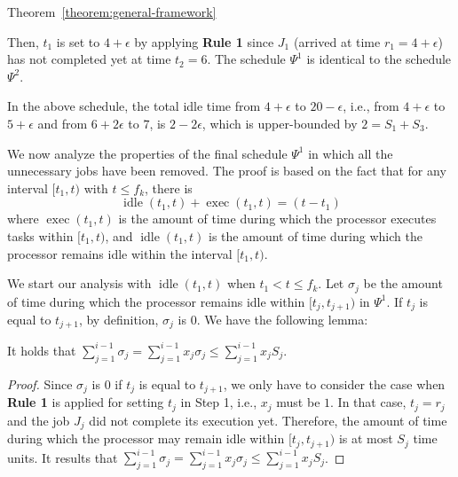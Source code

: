 \begin{appProof}{Theorem~\ref{theorem:general-framework}}
\begin{example}
Then, $t_1$ is set to $4+\epsilon$ by applying {\bf Rule 1} since
$J_1$ (arrived at time $r_1=4+\epsilon$) has not completed yet at time
$t_2=6$.  The schedule $\Psi^1$ is identical to the schedule
$\Psi^2$.


In the above schedule, the total idle time from $4+\epsilon$ to
$20-\epsilon$, i.e., from $4+\epsilon$ to $5+\epsilon$ and from
$6+2\epsilon$ to $7$, is $2-2\epsilon$, which is upper-bounded by $2 =
S_1+S_3$. 
\myendproof
\end{example}


We now analyze the properties of the final schedule $\Psi^1$ in which all the unnecessary jobs have been removed. 
The proof is based on the fact that for any interval $[t_1, t)$ with $t \leq f_k$, there is 
\begin{equation}
\label{eq:exec_plus_idle}
\operatorname{idle}(t_1, t) + \operatorname{exec}(t_1, t)  = (t - t_1)
\end{equation}
where $\operatorname{exec}(t_1, t)$ is the amount of time during which the processor executes tasks within $[t_1, t)$, and $\operatorname{idle}(t_1, t)$ is the amount of time during which the processor remains idle within the interval $[t_1, t)$.


We start our analysis with $\operatorname{idle}(t_1, t)$ when $t_1 < t \leq f_k$.
Let $\sigma_j$ be the amount of time during which the processor remains idle within $[t_j, t_{j+1})$ in $\Psi^1$. If $t_j$ is equal to $t_{j+1}$, by definition, $\sigma_j$ is $0$.
We have the following lemma:
\begin{Lemma}
\label{lem:max_idle}
It holds that $\sum_{j=1}^{i-1} \sigma_j  = \sum_{j=1}^{i-1} x_j \sigma_j\leq \sum_{j=1}^{i-1} x_j S_j$. %
\end{Lemma}
\begin{proof}
  Since $\sigma_j$ is $0$ if $t_j$ is equal to $t_{j+1}$, we only have
  to consider the case when {\bf Rule 1} is applied for setting $t_j$
  in Step 1, i.e., $x_j$ must be $1$.  In that case, $t_j = r_j$ and
  the job $J_j$ did not complete its execution yet. Therefore, the
  amount of time during which the processor may remain idle within
  $[t_j, t_{j+1})$ is at most $S_j$ time units.   It results that
  $\sum_{j=1}^{i-1} \sigma_j = \sum_{j=1}^{i-1} x_j \sigma_j \leq
  \sum_{j=1}^{i-1} x_j S_j$.
\end{proof}


\end{appProof}
